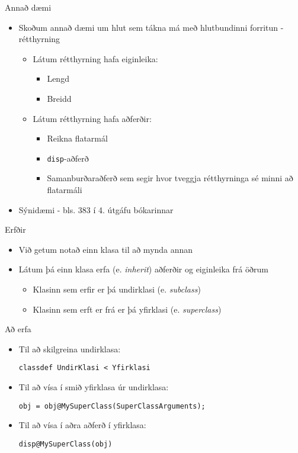 \documentclass{beamer}
\begin{document}
\begin{frame}{Annað dæmi}
\begin{itemize}
 \item Skoðum annað dæmi um hlut sem tákna má með hlutbundinni forritun - rétthyrning
 \begin{itemize}
  \item Látum rétthyrning hafa eiginleika:
  \begin{itemize}
   \item Lengd
   \item Breidd
  \end{itemize}
  \item Látum rétthyrning hafa aðferðir:
  \begin{itemize}
   \item Reikna flatarmál
   \item \texttt{disp}-aðferð
   \item Samanburðaraðferð sem segir hvor tveggja rétthyrninga sé minni að flatarmáli
  \end{itemize}
 \end{itemize}
 \item Sýnidæmi - bls. 383 í 4. útgáfu bókarinnar
\end{itemize}
\end{frame}

\begin{frame}{Erfðir}
\begin{itemize}
 \item Við getum notað einn klasa til að mynda annan
 \item Látum þá einn klasa erfa (e. \emph{inherit}) aðferðir og eiginleika frá öðrum
 \begin{itemize}
  \item Klasinn sem erfir er þá undirklasi (e. \emph{subclass})
  \item Klasinn sem erft er frá er þá yfirklasi (e. \emph{superclass})
 \end{itemize}
\end{itemize}
\end{frame}

\begin{frame}[fragile]{Að erfa}
\begin{itemize}
 \item Til að skilgreina undirklasa:
\begin{verbatim}
classdef UndirKlasi < Yfirklasi
\end{verbatim}
 \item Til að vísa í smið yfirklasa úr undirklasa:
\begin{verbatim}
obj = obj@MySuperClass(SuperClassArguments);
\end{verbatim}
\item Til að vísa í aðra aðferð í yfirklasa:
\begin{verbatim}
disp@MySuperClass(obj)
\end{verbatim}
\end{itemize}
\end{frame}
\end{document}
